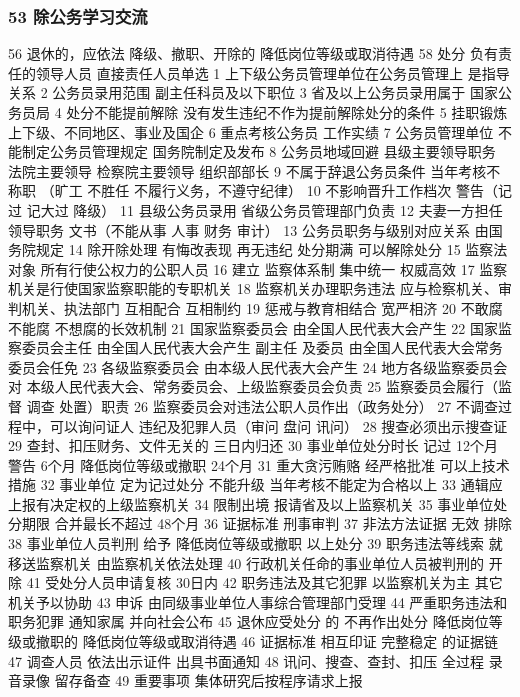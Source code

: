 \documentclass[11pt]{ctexart}
\begin{document}
\subsubsection{53 除公务学习交流}
\label{sec:org20f57fe}
56 退休的，应依法
降级、撤职、开除的 降低岗位等级或取消待遇
58 处分
负有责任的领导人员
直接责任人员单选
1 上下级公务员管理单位在公务员管理上
是指导关系
2 公务员录用范围
副主任科员及以下职位
3 省及以上公务员录用属于
国家公务员局
4 处分不能提前解除
没有发生违纪不作为提前解除处分的条件
5 挂职锻炼
上下级、不同地区、事业及国企
6 重点考核公务员
工作实绩
7 公务员管理单位
不能制定公务员管理规定
国务院制定及发布
8 公务员地域回避
县级主要领导职务
法院主要领导
检察院主要领导
组织部部长
9 不属于辞退公务员条件
当年考核不称职
（旷工 不胜任 不履行义务，不遵守纪律）
10 不影响晋升工作档次
警告（记过 记大过 降级）
11 县级公务员录用
省级公务员管理部门负责
12 夫妻一方担任领导职务
文书（不能从事 人事 财务 审计）
13 公务员职务与级别对应关系
由国务院规定
14 除开除处理
有悔改表现 再无违纪 处分期满 可以解除处分
15 监察法对象
所有行使公权力的公职人员
16 建立 监察体系制
集中统一 权威高效
17 监察机关是行使国家监察职能的专职机关
18 监察机关办理职务违法 应与检察机关、审判机关、执法部门
互相配合 互相制约
19 惩戒与教育相结合 宽严相济
20 不敢腐 不能腐 不想腐的长效机制
21 国家监察委员会
由全国人民代表大会产生
22 国家监察委员会主任 由全国人民代表大会产生 副主任 及委员
由全国人民代表大会常务委员会任免
23 各级监察委员会
由本级人民代表大会产生
24 地方各级监察委员会对
本级人民代表大会、常务委员会、上级监察委员会负责
25 监察委员会履行（监督 调查 处置）职责
26 监察委员会对违法公职人员作出（政务处分）
27 不调查过程中，可以询问证人
违纪及犯罪人员（审问 盘问 讯问）
28 搜查必须出示搜查证
29 查封、扣压财务、文件无关的
三日内归还
30 事业单位处分时长
记过 12个月
警告 6个月
降低岗位等级或撤职 24个月
31 重大贪污贿赂 经严格批准 可以上技术措施
32 事业单位 定为记过处分 不能升级 当年考核不能定为合格以上
33 通辑应上报有决定权的上级监察机关
34 限制出境
报请省及以上监察机关
35 事业单位处分期限 合并最长不超过
48个月
36 证据标准
刑事审判
37 非法方法证据
无效 排除
38 事业单位人员判刑
给予 降低岗位等级或撤职 以上处分
39 职务违法等线索
就移送监察机关 由监察机关依法处理
40 行政机关任命的事业单位人员被判刑的
开除
41 受处分人员申请复核
   30日内
42 职务违法及其它犯罪
以监察机关为主 其它机关予以协助
43 申诉
由同级事业单位人事综合管理部门受理
44 严重职务违法和职务犯罪
通知家属 并向社会公布
45 退休应受处分 的
不再作出处分 降低岗位等级或撤职的 降低岗位等级或取消待遇
46 证据标准
相互印证 完整稳定 的证据链
47 调查人员
依法出示证件 出具书面通知
48 讯问、搜查、查封、扣压
全过程 录音录像 留存备查
49 重要事项
集体研究后按程序请求上报
\end{document}

